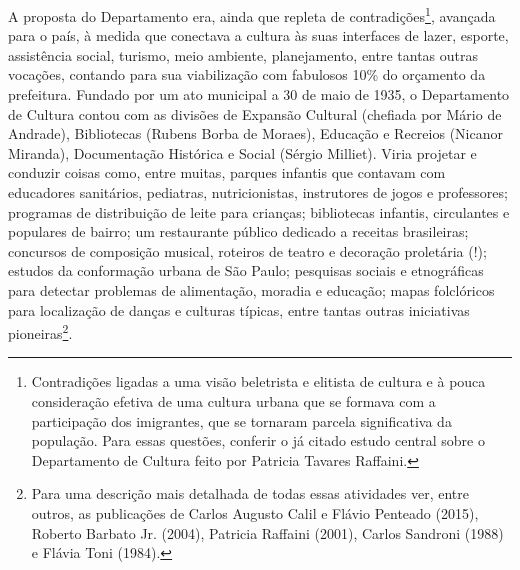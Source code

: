 A proposta do Departamento era, ainda que repleta de
contradições\footnote{Contradições ligadas a uma visão beletrista e
  elitista de cultura e à pouca consideração efetiva de uma cultura
  urbana que se formava com a participação dos imigrantes, que se
  tornaram parcela significativa da população. Para essas questões,
  conferir o já citado estudo central sobre o Departamento de Cultura
  feito por Patricia Tavares Raffaini.}, avançada para o país, à medida
que conectava a cultura às suas interfaces de lazer, esporte,
assistência social, turismo, meio ambiente, planejamento, entre tantas
outras vocações, contando para sua viabilização com fabulosos 10\% do
orçamento da prefeitura. Fundado por um ato municipal a 30 de maio de
1935, o Departamento de Cultura contou com as divisões de Expansão
Cultural (chefiada por Mário de Andrade), Bibliotecas (Rubens Borba de
Moraes), Educação e Recreios (Nicanor Miranda), Documentação Histórica e
Social (Sérgio Milliet). Viria projetar e conduzir coisas como, entre
muitas, parques infantis que contavam com educadores sanitários,
pediatras, nutricionistas, instrutores de jogos e professores; programas
de distribuição de leite para crianças; bibliotecas infantis,
circulantes e populares de bairro; um restaurante público dedicado a
receitas brasileiras; concursos de composição musical, roteiros de
teatro e decoração proletária (!); estudos da conformação urbana de São
Paulo; pesquisas sociais e etnográficas para detectar problemas de
alimentação, moradia e educação; mapas folclóricos para localização de
danças e culturas típicas, entre tantas outras iniciativas
pioneiras\footnote{Para uma descrição mais detalhada de todas essas
  atividades ver, entre outros, as publicações de Carlos Augusto Calil e
  Flávio Penteado (2015), Roberto Barbato Jr. (2004), Patricia Raffaini
  (2001), Carlos Sandroni (1988) e Flávia Toni (1984).}.

